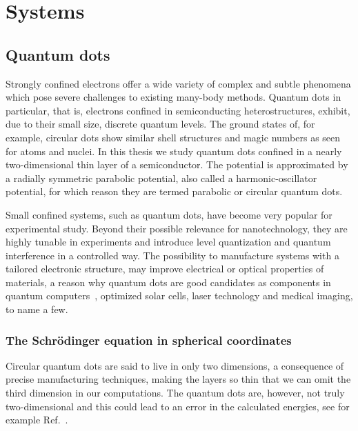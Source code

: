 \chapter{Systems}
\label{ch:qDots}


\section{Quantum dots}
Strongly confined electrons offer a wide variety of complex and subtle phenomena which pose severe  challenges to existing many-body methods.
Quantum dots in particular, that is, electrons confined in semiconducting heterostructures, exhibit, due to their small size, discrete quantum levels. 
The ground states of, for example, circular dots show similar shell structures and magic numbers as seen for atoms and nuclei.
In this thesis we study quantum dots confined in a nearly two-dimensional thin layer of a semiconductor.
The potential is approximated by a radially symmetric parabolic potential, also called a harmonic-oscillator potential, for which reason they are termed parabolic or circular quantum dots.

Small confined systems, such as quantum dots, have become very popular for experimental 
study. 
Beyond their possible relevance for nanotechnology, they are highly tunable in experiments and introduce level quantization and quantum interference in a controlled way. 
The possibility to manufacture systems with a tailored electronic structure, may improve electrical or optical properties of materials, a reason why quantum dots are good candidates as components in quantum computers~\cite{PhysRevA.57.120}, optimized solar cells, laser technology and medical imaging, to name a few.



\subsection{The Schrödinger equation in spherical coordinates}
Circular quantum dots are said to live in only two dimensions, a consequence of precise manufacturing techniques, making the layers so thin that we can omit the third dimension in our computations.
The quantum dots are, however, not truly two-dimensional and this could lead to an error in the calculated energies, see for example Ref.~\cite{RevLett.79.1389}.

